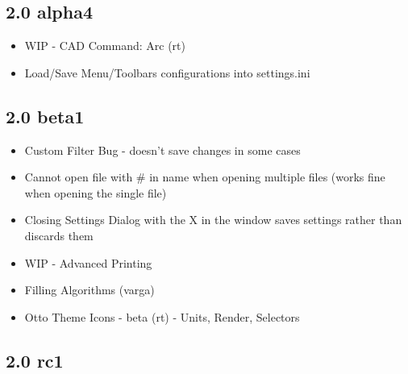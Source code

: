 \documentclass[10pt]{report}
\begin{document}
\subsection{2.0 alpha4}

\begin{itemize}
\item WIP - CAD Command: Arc (rt)
\item Load/Save Menu/Toolbars configurations into settings.ini
\end{itemize}

\subsection{2.0 beta1}

\begin{itemize}
\item Custom Filter Bug - doesn't save changes in some cases
\item Cannot open file with \# in name when opening multiple files (works fine when opening the single file)
\item Closing Settings Dialog with the X in the window saves settings rather than discards them
\item WIP - Advanced Printing
\item Filling Algorithms (varga)
\item Otto Theme Icons - beta (rt) - Units, Render, Selectors
\end{itemize}

\subsection{2.0 rc1}
\end{document}
